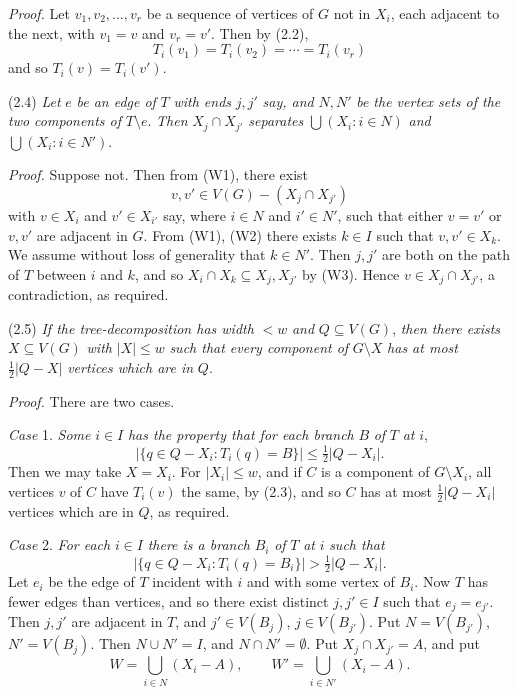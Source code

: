 \textit{Proof.} Let $v_1, v_2, \dots, v_r$ be a sequence of vertices of $G$ not in $X_i$, each adjacent to the next, with $v_1 = v$ and $v_r = v'$. Then by (2.2),
\begin{equation*}
T_i(v_1) = T_i(v_2) = \cdots = T_i(v_r)
\end{equation*}
and so $T_i(v) = T_i(v')$.

\stmt
(2.4) \textit{Let} $e$ \textit{be an edge of} $T$ \textit{with ends} $j, j'$ \textit{say, and} $N, N'$ \textit{be the vertex sets of the two components of} $T \setminus e$. \textit{Then} $X_j \cap X_{j'}$ \textit{separates} $\bigcup(X_i : i \in N)$ \textit{and} $\bigcup(X_i : i \in N')$.

\textit{Proof.} Suppose not. Then from (W1), there exist
\begin{equation*}
v, v' \in V(G) - (X_j \cap X_{j'})
\end{equation*}
with $v \in X_i$ and $v' \in X_{i'}$ say, where $i \in N$ and $i' \in N'$, such that either $v = v'$ or $v, v'$ are adjacent in $G$. From (W1), (W2) there exists $k \in I$ such that $v, v' \in X_k$. We assume without loss of generality that $k \in N'$. Then $j, j'$ are both on the path of $T$ between $i$ and $k$, and so $X_i \cap X_k \subseteq X_j, X_{j'}$ by (W3). Hence $v \in X_j \cap X_{j'}$, a contradiction, as required.

\stmt
(2.5) \textit{If the tree-decomposition has width} $< w$ \textit{and} $Q \subseteq V(G)$, \textit{then there exists} $X \subseteq V(G)$ \textit{with} $|X| \le w$ \textit{such that every component of} $G \setminus X$ \textit{has at most} $\tfrac{1}{2} |Q - X|$ \textit{vertices which are in} $Q$.

\textit{Proof.} There are two cases.

\textit{Case} 1. \textit{Some} $i \in I$ \textit{has the property that for each branch} $B$ \textit{of} $T$ \textit{at} $i$,
\begin{equation*}
|\{q \in Q - X_i : T_i(q) = B\}| \le \tfrac{1}{2} |Q - X_i|.
\end{equation*}
Then we may take $X = X_i$. For $|X_i| \le w$, and if $C$ is a component of $G \setminus X_i$, all vertices $v$ of $C$ have $T_i(v)$ the same, by (2.3), and so $C$ has at most $\tfrac{1}{2} |Q - X_i|$ vertices which are in $Q$, as required.

\textit{Case} 2. \textit{For each} $i \in I$ \textit{there is a branch} $B_i$ \textit{of} $T$ \textit{at} $i$ \textit{such that}
\begin{equation*}
|\{q \in Q - X_i : T_i(q) = B_i\}| > \tfrac{1}{2} |Q - X_i|.
\end{equation*}
Let $e_i$ be the edge of $T$ incident with $i$ and with some vertex of $B_i$. Now $T$ has fewer edges than vertices, and so there exist distinct $j, j' \in I$ such that $e_j = e_{j'}$. Then $j, j'$ are adjacent in $T$, and $j' \in V(B_j)$, $j \in V(B_{j'})$. Put $N = V(B_{j'})$, $N' = V(B_j)$. Then $N \cup N' = I$, and $N \cap N' = \emptyset$. Put $X_j \cap X_{j'} = A$, and put
\begin{equation*}
W = \bigcup_{i \in N} (X_i - A), \qquad W' = \bigcup_{i \in N'} (X_i - A).
\end{equation*}
